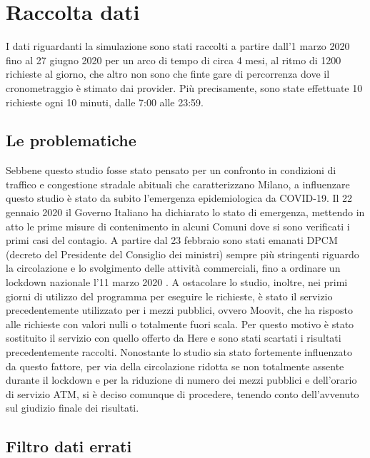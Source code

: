 \section{Raccolta dati}

I dati riguardanti la simulazione sono stati raccolti a partire dall'1 marzo 2020 fino al 27 giugno 2020 per un arco di tempo di circa 4 mesi, al ritmo di 1200 richieste al giorno, che altro non sono che finte gare di percorrenza dove il cronometraggio è stimato dai provider. Più precisamente, sono state effettuate 10 richieste ogni 10 minuti, dalle 7:00 alle 23:59.

\subsection{Le problematiche}

Sebbene questo studio fosse stato pensato per un confronto in condizioni di traffico e congestione stradale abituali che caratterizzano Milano, a influenzare questo studio è stato da subito l'emergenza epidemiologica da COVID-19. Il 22 gennaio 2020 il Governo Italiano ha dichiarato lo stato di emergenza, mettendo in atto le prime misure di contenimento in alcuni Comuni dove si sono verificati i primi casi del contagio. A partire dal 23 febbraio sono stati emanati DPCM (decreto del Presidente del Consiglio dei ministri) sempre più stringenti riguardo la circolazione e lo svolgimento delle attività commerciali, fino a ordinare un lockdown nazionale l'11 marzo 2020 \cite{misuredelgovernopercovid}. A ostacolare lo studio, inoltre, nei primi giorni di utilizzo del programma per eseguire le richieste, è stato il servizio precedentemente utilizzato per i mezzi pubblici, ovvero Moovit, che ha risposto alle richieste con valori nulli o totalmente fuori scala. Per questo motivo è stato sostituito il servizio con quello offerto da Here e sono stati scartati i risultati precedentemente raccolti. Nonostante lo studio sia stato fortemente influenzato da questo fattore, per via della circolazione ridotta se non totalmente assente durante il lockdown e per la riduzione di numero dei mezzi pubblici e dell'orario di servizio ATM, si è deciso comunque di procedere, tenendo conto dell'avvenuto sul giudizio finale dei risultati.

\subsection{Filtro dati errati}

